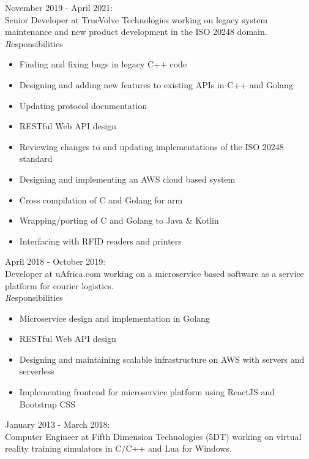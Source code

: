 \documentclass[11pt,a4paper]{article}
\begin{document}
{\noindent\large November 2019 - April 2021:}\\

Senior Developer at TrueVolve Technologies working on legacy system maintenance and new product development in the ISO 20248 domain.
\\

	{\emph Responsibilities}
	\begin{itemize}
		\item Finding and fixing bugs in legacy C++ code
		\item Designing and adding new features to existing APIs in C++ and Golang
		\item Updating protocol documentation
		\item RESTful Web API design
		\item Reviewing changes to and updating implementations of the ISO 20248 standard 
		\item Designing and implementing an AWS cloud based system
		\item Cross compilation of C and Golang for arm
		\item Wrapping/porting of C and Golang to Java \& Kotlin
		\item Interfacing with RFID readers and printers
	\end{itemize}
	
{\noindent\large April 2018 - October 2019:}\\

Developer at uAfrica.com working on a microservice based software as a service platform for courier logistics.
\\

	{\emph Responsibilities}
	\begin{itemize}
	\item Microservice design and implementation in Golang
	\item RESTful Web API design
	\item Designing and maintaining scalable infrastructure on AWS with servers and serverless
	\item Implementing frontend for microservice platform using ReactJS and Bootstrap CSS
	\end{itemize}

{\noindent\large January 2013 - March 2018:}\\

	Computer Engineer at Fifth Dimension Technologies (5DT) working on virtual reality training simulators in C/C++ and Lua for Windows.\\
\end{document}
